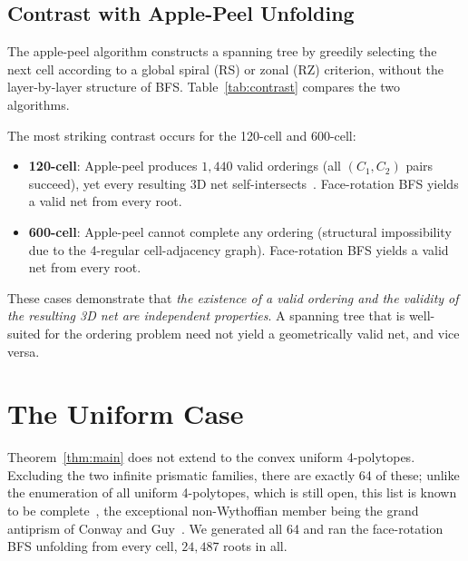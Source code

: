 \documentclass[11pt,letterpaper]{article}
\begin{document}
\subsection{Contrast with Apple-Peel Unfolding}\label{sec:contrast}

The apple-peel algorithm \cite{YoshinoChaidee2026} constructs a
spanning tree by greedily selecting the next cell according to a
global spiral (RS) or zonal (RZ) criterion, without the layer-by-layer
structure of BFS.
Table~\ref{tab:contrast} compares the two algorithms.

\noindent
The most striking contrast occurs for the 120-cell and 600-cell:

\begin{itemize}
\item \textbf{120-cell}: Apple-peel produces $1{,}440$ valid orderings
  (all $(C_1, C_2)$ pairs succeed), yet every resulting 3D net
  self-intersects~\cite{YoshinoChaidee2026}.
  Face-rotation BFS yields a valid net from every root.

\item \textbf{600-cell}: Apple-peel cannot complete any ordering
  (structural impossibility due to the 4-regular cell-adjacency graph).
  Face-rotation BFS yields a valid net from every root.
\end{itemize}

These cases demonstrate that \emph{the existence of a valid ordering
and the validity of the resulting 3D net are independent properties}.
A spanning tree that is well-suited for the ordering problem
need not yield a geometrically valid net, and vice versa.

\section{The Uniform Case}\label{sec:uniform}

Theorem~\ref{thm:main} does not extend to the convex uniform
4-polytopes.
Excluding the two infinite prismatic families, there are exactly 64 of
these; unlike the enumeration of all uniform 4-polytopes, which is
still open, this list is known to be complete~\cite{ConwayGuy1965,Moeller2004},
the exceptional non-Wythoffian member being the grand antiprism of
Conway and Guy~\cite{ConwayGuy1965}.
We generated all 64 and ran the face-rotation BFS unfolding from every
cell, $24{,}487$ roots in all.
\end{document}
